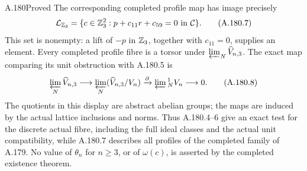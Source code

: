 \begin{statement}{A.180}{Proved}
The corresponding completed profile map has image precisely
\[
 \mathcal L_{\mathbb Z_3}
   =\{c\in\mathbb Z_3^2:p+c_{11}r+c_{59}=0\text{ in }\mathcal C\}.
\tag{A.180.7}
\]
This set is nonempty: a lift of \(-p\) in \(\mathbb Z_3\), together
with \(c_{11}=0\), supplies an element.  Every completed profile
fibre is a torsor under \(\varprojlim_N\widehat V_{n,3}\).
The exact map comparing its unit obstruction with A.180.5 is
\[
 \varprojlim_N\widehat V_{n,3}\longrightarrow
 \varprojlim_N(\widehat V_{n,3}/V_n)
       \xrightarrow{\partial}\varprojlim{}^{1}_N V_n
       \longrightarrow0.
\tag{A.180.8}
\]
The quotients in this display are abstract abelian groups; the maps
are induced by the actual lattice inclusions and norms.  Thus
A.180.4--6 give an exact test for the discrete actual fibre, including
the full ideal classes and the actual unit compatibility, while
A.180.7 describes all profiles of the completed family of A.179.
No value of \(\theta_n\) for \(n\ge3\), or of \(\omega(c)\),
is asserted by the completed existence theorem.
\end{statement}

